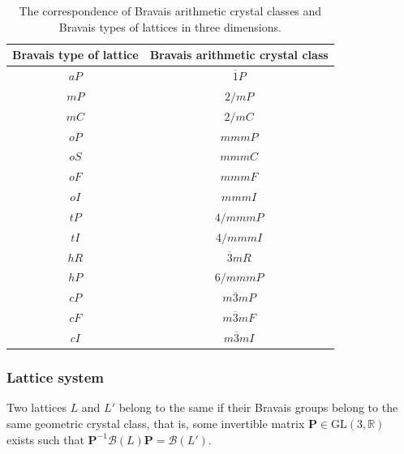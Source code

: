 \begin{table}[htb]
  \centering
  \caption{The correspondence of Bravais arithmetic crystal classes and Bravais types of lattices in three dimensions.}
  \label{table:arithmetic-class-3d}
  \begin{tabular}{cc}
    \hline\hline
    Bravais type of lattice & Bravais arithmetic crystal class \\ \hline
    $aP$                    & $\overline{1}P$                  \\
    $mP$                    & $2/mP$                           \\
    $mC$                    & $2/mC$                           \\
    $oP$                    & $mmmP$                           \\
    $oS$                    & $mmmC$                           \\
    $oF$                    & $mmmF$                           \\
    $oI$                    & $mmmI$                           \\
    $tP$                    & $4/mmmP$                         \\
    $tI$                    & $4/mmmI$                         \\
    $hR$                    & $\overline{3}mR$                 \\
    $hP$                    & $6/mmmP$                         \\
    $cP$                    & $m\overline{3}mP$                \\
    $cF$                    & $m\overline{3}mF$                \\
    $cI$                    & $m\overline{3}mI$                \\
    \hline\hline
  \end{tabular}
\end{table}

\subsubsection{\label{sec:lattice-system}Lattice system}

\begin{screen}
  \begin{defn}
    Two lattices $L$ and $L'$ belong to the same  if their Bravais groups belong to the same geometric crystal class, that is, some invertible matrix $\bm{P} \in \mathrm{GL}(3, \mathbb{R})$ exists such that $\bm{P}^{-1} \mathcal{B}(L) \bm{P} = \mathcal{B}(L')$.
  \end{defn}
\end{screen}

